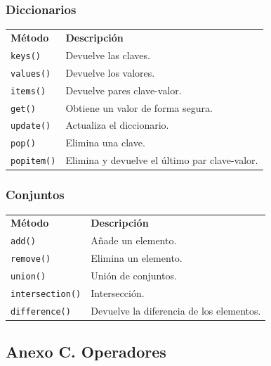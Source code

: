 \documentclass[11pt,a5paper,twoside]{book}
\begin{document}
\subsubsection{Diccionarios}

\begin{tcolorbox}
\begin{tabular}{ll}
 \textbf{Método}      &  \textbf{Descripción}                        \\
 {\scriptsize \texttt{keys()}}    &  Devuelve las claves.               \\
 {\scriptsize \texttt{values()}}  &  Devuelve los valores.              \\
 {\scriptsize \texttt{items()}}   &  Devuelve pares clave-valor.        \\
 {\scriptsize \texttt{get()}}     &  Obtiene un valor de forma segura.  \\
 {\scriptsize \texttt{update()}}  &  Actualiza el diccionario.          \\
 {\scriptsize \texttt{pop()}}     &  Elimina una clave.                 \\
 {\scriptsize \texttt{popitem()}} &  Elimina y devuelve el último par clave-valor. \\
\end{tabular}
\end{tcolorbox}
\subsubsection{Conjuntos}

\begin{tcolorbox}
\begin{tabular}{ll}
 \textbf{Método}            &  \textbf{Descripción}           \\
 {\scriptsize \texttt{add()}}           &  Añade un elemento.    \\
 {\scriptsize \texttt{remove()}}        &  Elimina un elemento.  \\
 {\scriptsize \texttt{union()}}         &  Unión de conjuntos.   \\
 {\scriptsize \texttt{intersection()}}  &  Intersección.         \\
 {\scriptsize \texttt{difference()}}    &  Devuelve la diferencia de los elementos. \\
\end{tabular}
\end{tcolorbox}
\subsection{Anexo C. Operadores}
\end{document}
